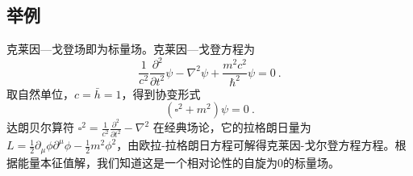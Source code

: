 \subsection{举例}
克莱因—戈登场即为标量场。克莱因—戈登方程为
\begin{equation}
\frac{1}{c^{2}} \frac{\partial^{2}}{\partial t^{2}} \psi-\nabla^{2} \psi+\frac{m^{2} c^{2}}{\hbar^{2}} \psi=0~.
\end{equation}
取自然单位，$c=\bar{h}=1$，得到协变形式
\begin{equation}
\left(\square^{2}+m^{2}\right) \psi=0~.
\end{equation}
达朗贝尔算符 $\square^{2}=\frac{1}{c^{2}} \frac{\partial^{2}}{\partial t^{2}}-\nabla^{2}$
在经典场论，它的拉格朗日量为 $L=\frac{1}{2} \partial_{\mu} \phi \partial^{\mu} \phi-\frac{1}{2} m^{2} \phi^{2}$，由欧拉-拉格朗日方程可解得克莱因-戈尔登方程方程。根据能量本征值解，我们知道这是一个相对论性的自旋为0的标量场。
